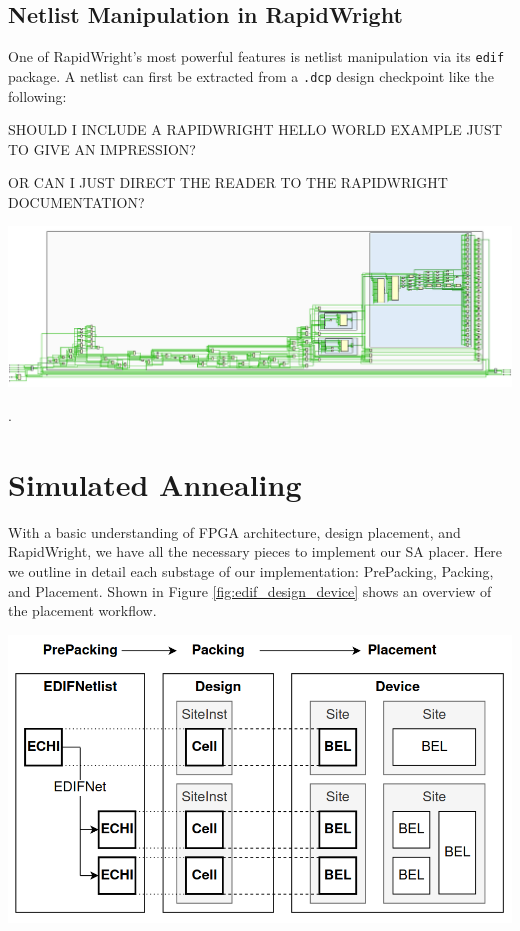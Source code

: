 \documentclass{article}
\begin{document}
    \begin{multicols}{2}

    \subsection{Netlist Manipulation in RapidWright}

    One of RapidWright's most powerful features is netlist manipulation via its \texttt{edif} package. 
    A netlist can first be extracted from a \texttt{.dcp} design checkpoint like the following: 

    SHOULD I INCLUDE A RAPIDWRIGHT HELLO WORLD EXAMPLE JUST TO GIVE AN IMPRESSION?

    OR CAN I JUST DIRECT THE READER TO THE RAPIDWRIGHT DOCUMENTATION?



    \end{multicols}
    {
        \centering
        \includegraphics[width=\columnwidth]{figures/raw_edif.png}
        \label{fig:raw_edif}
    }
    \begin{multicols}{2}

    .

\newpage
\section{Simulated Annealing}
    \label{sec:simulated_annealing}
    With a basic understanding of FPGA architecture, design placement, and RapidWright, we have all the necessary pieces to implement our SA placer. 
    Here we outline in detail each substage of our implementation: PrePacking, Packing, and Placement. 
    Shown in Figure \ref{fig:edif_design_device} shows an overview of the placement workflow. 

    {
        \centering
        \includegraphics[width=0.9\columnwidth]{figures/edif_design_device.png}
        \label{fig:edif_design_device}
    }

    \end{multicols}
\end{document}
